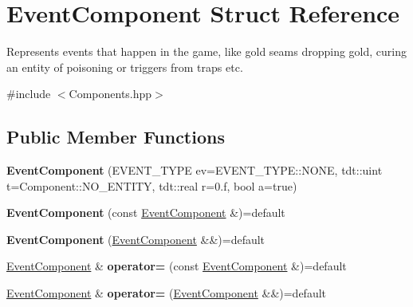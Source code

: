 \hypertarget{struct_event_component}{}\section{Event\+Component Struct Reference}
\label{struct_event_component}


Represents events that happen in the game, like gold seams dropping gold, curing an entity of poisoning or triggers from traps etc.  




{\ttfamily \#include $<$Components.\+hpp$>$}

\subsection*{Public Member Functions}
\begin{DoxyCompactItemize}
\item 
{\bfseries Event\+Component} (E\+V\+E\+N\+T\+\_\+\+T\+Y\+PE ev=E\+V\+E\+N\+T\+\_\+\+T\+Y\+P\+E\+::\+N\+O\+NE, tdt\+::uint t=Component\+::\+N\+O\+\_\+\+E\+N\+T\+I\+TY, tdt\+::real r=0.f, bool a=true)\hypertarget{struct_event_component_a2aa1deb7ea3815614b05e54da4843a68}{}\label{struct_event_component_a2aa1deb7ea3815614b05e54da4843a68}

\item 
{\bfseries Event\+Component} (const \hyperlink{struct_event_component}{Event\+Component} \&)=default\hypertarget{struct_event_component_a384ff98804daad15afcd85f34e1abd66}{}\label{struct_event_component_a384ff98804daad15afcd85f34e1abd66}

\item 
{\bfseries Event\+Component} (\hyperlink{struct_event_component}{Event\+Component} \&\&)=default\hypertarget{struct_event_component_aa1cc574920ccaa3a62ec781cb8d0d650}{}\label{struct_event_component_aa1cc574920ccaa3a62ec781cb8d0d650}

\item 
\hyperlink{struct_event_component}{Event\+Component} \& {\bfseries operator=} (const \hyperlink{struct_event_component}{Event\+Component} \&)=default\hypertarget{struct_event_component_a3dcc4aab5c42862071d81023168ce832}{}\label{struct_event_component_a3dcc4aab5c42862071d81023168ce832}

\item 
\hyperlink{struct_event_component}{Event\+Component} \& {\bfseries operator=} (\hyperlink{struct_event_component}{Event\+Component} \&\&)=default\hypertarget{struct_event_component_aca718a5d3cefcad57ad321a8e98b12f4}{}\label{struct_event_component_aca718a5d3cefcad57ad321a8e98b12f4}

\end{DoxyCompactItemize}
